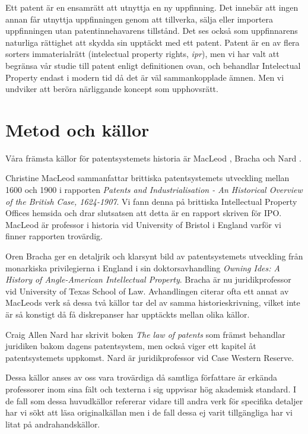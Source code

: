  
 Ett patent är en ensamrätt att utnyttja en ny uppfinning. Det innebär att ingen
 annan får utnyttja uppfinningen genom att tillverka, sälja eller importera 
 uppfinningen utan patentinnehavarens tillstånd. Det ses också som uppfinnarens naturliga rättighet att skydda sin upptäckt med ett patent. Patent är en av flera sorters
 immaterialrätt (intelectual property rights, \emph{ipr}), men vi har valt att begränsa vår studie till patent enligt
 definitionen ovan, och behandlar Intelectual Property endast i modern tid då det är väl sammankopplade ämnen. Men vi undviker att beröra närliggande koncept som upphovsrätt.

\section{Metod och källor}

Våra främsta källor för patentsystemets historia är MacLeod \cite{macleod},
Bracha \cite{bracha} och Nard \cite{nard}.

Christine MacLeod sammanfattar brittiska patentsystemets utveckling mellan 
1600 och 1900 i rapporten \emph{Patents and Industrialisation - An Historical 
Overview of the British Case, 1624-1907}. Vi fann denna på brittiska 
Intellectual Property Offices hemsida och drar slutsatsen att detta är en 
rapport skriven för IPO. MacLeod är professor i historia vid University of 
Bristol i England varför vi finner rapporten trovärdig.

Oren Bracha ger en detaljrik och klarsynt bild av patentsystemets utveckling 
från monarkiska privilegierna i England i sin doktorsavhandling \emph{Owning 
Ides: A History of Angle-American Intellectual Property}. Bracha är nu 
juridikprofessor vid University of Texas School of Law. Avhandlingen citerar 
ofta ett annat av MacLeods verk så dessa två källor tar del av samma 
historieskrivning, vilket inte är så konstigt då få diskrepanser har upptäckts 
mellan olika källor.

Craig Allen Nard har skrivit boken \emph{The law of patents} som främst 
behandlar juridiken bakom dagens patentsystem, men också viger ett kapitel åt 
patentsystemets uppkomst. Nard är juridikprofessor vid Case Western Reserve.

Dessa källor anses av oss vara trovärdiga då samtliga författare är erkända 
professorer inom sina fält och texterna i sig uppvisar hög akademisk standard. 
I de fall som dessa huvudkällor refererar vidare till andra verk för 
specifika detaljer har vi sökt att läsa originalkällan men i de fall dessa ej 
varit tillgängliga har vi litat på andrahandskällor.

